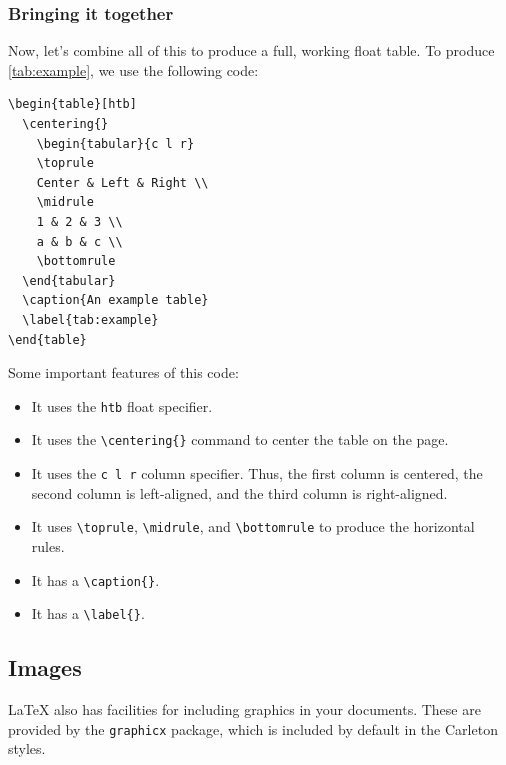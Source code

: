 \documentclass{article}
\newcommand*{\code}[1]{\texttt{#1}}
\begin{document}
\subsubsection{Bringing it together}
Now, let's combine all of this to produce a full, working float table.
To produce \cref{tab:example}, we use the following code:
\begin{verbatim}
\begin{table}[htb]
  \centering{}
    \begin{tabular}{c l r}
    \toprule
    Center & Left & Right \\
    \midrule
    1 & 2 & 3 \\
    a & b & c \\
    \bottomrule
  \end{tabular}
  \caption{An example table}
  \label{tab:example}
\end{table}
\end{verbatim}

Some important features of this code:
\begin{itemize}
\item
  It uses the \code{htb} float specifier.

\item
  It uses the \code{\textbackslash{}centering\{\}} command to center the table on the page.

\item
  It uses the \code{c l r} column specifier.
  Thus, the first column is centered, the second column is left-aligned, and the third column is right-aligned.

\item
  It uses \code{\textbackslash{}toprule}, \code{\textbackslash{}midrule}, and \code{\textbackslash{}bottomrule} to produce the horizontal rules.

\item
  It has a \code{\textbackslash{}caption\{\}}.

\item
  It has a \code{\textbackslash{}label\{\}}.
\end{itemize}

\subsection{Images}
\label{s:images}
\LaTeX{} also has facilities for including graphics in your documents.
These are provided by the \code{graphicx} package, which is included by default in the Carleton styles.
\end{document}
